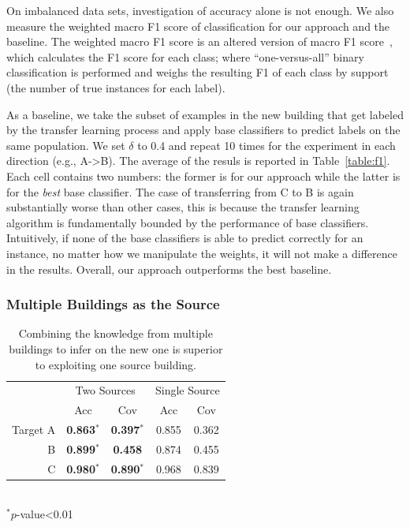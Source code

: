 On imbalanced data sets, investigation of accuracy alone is not enough. We also measure the weighted macro F1 score of 
classification for our approach and the baseline. The weighted macro F1 score is an altered version of macro F1 score~\cite{yang}, 
which calculates the F1 score for each class; where ``one-versus-all'' binary classification is performed and weighs the resulting F1 of each class by support (the number of true instances for each label). 

As a baseline, we take the subset of examples in the new building that get labeled by the transfer learning process and apply base classifiers to predict labels on the same population. 
We set $\delta$ to 0.4 and  
repeat 10 times for the experiment in each direction (e.g., A->B). The average of the resuls is reported in Table~\ref{table:f1}. 
Each cell contains two numbers: the former is for our approach while the latter is for the {\it best} base classifier.
The case of transferring from C to B is again substantially worse than other cases, this is because the transfer learning algorithm is fundamentally bounded by the performance of base classifiers. 
Intuitively, if none of the base classifiers is able to predict correctly for an instance, no matter how we manipulate the weights, it will not make a difference in the results.
Overall, our approach outperforms the best baseline.


\subsubsection{Multiple Buildings as the Source}

\begin{table}[h]
\centering
\begin{tabular}{r|cc|cc}
\hline
\multirow{2}{*}{} & \multicolumn{2}{c|}{Two Sources} & \multicolumn{2}{c}{Single Source} \\ \cline{2-5} 
 & Acc & Cov & Acc & Cov \\ \hline
Target A & {\bf 0.863$^\ast$} & {\bf 0.397$^\ast$} & 0.855 & 0.362 \\ \hline
B & {\bf 0.899$^\ast$} & {\bf 0.458} & 0.874 & 0.455 \\ \hline
C & {\bf 0.980$^\ast$} & {\bf 0.890$^\ast$} & 0.968 & 0.839 \\ \hline
\end{tabular}
\\\noindent
$^\ast p$-value<0.01
\caption{Combining the knowledge from multiple buildings to infer on the new one is superior to exploiting one source building.}
\label{2source}
\end{table}


